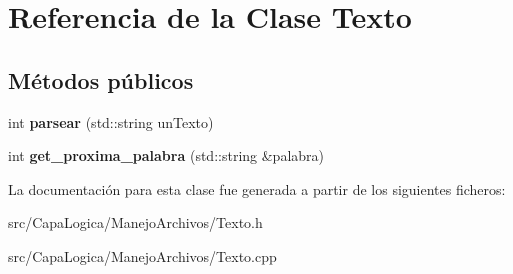 \hypertarget{class_texto}{\section{\-Referencia de la \-Clase \-Texto}
\label{class_texto}
}
\subsection*{\-Métodos públicos}
\begin{DoxyCompactItemize}
\item 
\hypertarget{class_texto_ade9703599d6946db181ef1d00241482d}{int {\bfseries parsear} (std\-::string un\-Texto)}\label{class_texto_ade9703599d6946db181ef1d00241482d}

\item 
\hypertarget{class_texto_ad208d6747ce664a32c400b6c1b9cd72e}{int {\bfseries get\-\_\-proxima\-\_\-palabra} (std\-::string \&palabra)}\label{class_texto_ad208d6747ce664a32c400b6c1b9cd72e}

\end{DoxyCompactItemize}


\-La documentación para esta clase fue generada a partir de los siguientes ficheros\-:\begin{DoxyCompactItemize}
\item 
src/\-Capa\-Logica/\-Manejo\-Archivos/\-Texto.\-h\item 
src/\-Capa\-Logica/\-Manejo\-Archivos/\-Texto.\-cpp\end{DoxyCompactItemize}
